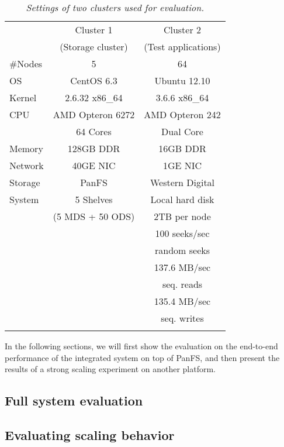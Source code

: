 \begin{footnotesize}
\begin{table}
\begin{tabular}{lcc}
\toprule
      & Cluster 1 & Cluster 2 \\
      & (Storage cluster) & (Test applications)\\
\midrule
\#Nodes & 5 & 64 \\
\hline
OS &   CentOS 6.3 &  Ubuntu 12.10 \\
Kernel & 2.6.32 x86\_64 & 3.6.6 x86\_64 \\
\hline
CPU & AMD Opteron 6272 &  AMD Opteron 242 \\
    & 64 Cores & Dual Core\\
\hline
Memory & 128GB DDR &  16GB DDR \\
\hline
Network & 40GE NIC &  1GE NIC  \\
\hline
Storage & PanFS & Western Digital \\
System &      5 Shelves & Local hard disk  \\
       &   (5 MDS + 50 ODS) &  2TB per node  \\
\hline
& & 100 seeks/sec \\
& & random seeks   \\
& & 137.6 MB/sec  \\
& & seq. reads    \\
& & 135.4 MB/sec  \\
& & seq. writes   \\
\bottomrule \\
\end{tabular}
\caption{
\textit{\footnotesize Settings of two clusters used for evaluation.}
}
\label{tab:setting}
\end{table}
\end{footnotesize}

In the following sections, we will first show the evaluation
on the end-to-end performance of the integrated system on top of PanFS,
and then present the results of a strong scaling experiment on another platform.

\subsection{Full system evaluation}
\label{sec:fullsystem}


\subsection{Evaluating scaling behavior}

